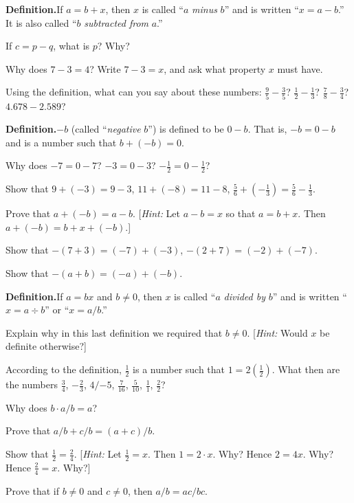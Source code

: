 \documentclass[11pt]{book}
\theoremstyle{bkplain}
\theoremstyle{XIplainnote}
\theoremstyle{bkplain}
\theoremstyle{bkplain}
\begin{document}
\medskip
\noindent\textbf{Definition.}\quad If $a = b + x$, then $x$ is called ``$a$
\emph{minus} $b$'' and is written ``$x = a - b$.'' It is also called ``$b$
\emph{subtracted from} $a$.''

\begin{exlist}
\item If $c = p - q$, what is $p$? Why?
\item Why does $7 - 3 = 4$? Write $7 - 3 = x$, and ask what property $x$ must
      have.
\item Using the definition, what can you say about these numbers:
      $\frac{9}{5} - \frac{3}{5}$? $\frac{1}{2} - \frac{1}{3}$?
      $\frac{7}{8} - \frac{3}{4}$? $4.678 - 2.589$?
\end{exlist}

\medskip
\noindent\textbf{Definition.}\quad $-b$ (called ``\emph{negative} $b$'') is
defined to be $0 - b$. That is, $-b = 0 - b$ and is a number such that
$b + (-b) = 0$.

\begin{exlist}[start=4]
\item Why does $-7 = 0 - 7$? $-3 = 0 - 3$?
      $-\frac{1}{2} = 0 - \frac{1}{2}$?
\item Show that $9 + (-3) = 9 - 3$, $11 + (-8) = 11 - 8$,
      $\frac{5}{6} + (-\frac{1}{3}) = \frac{5}{6} - \frac{1}{3}$.
\item[\stex 6.] Prove that $a + (-b) = a - b$. [\emph{Hint:} Let $a - b = x$ so
      that $a = b + x$. Then $a + (-b) = b + x + (-b)$.]
\item[7.] Show that $-(7 + 3) = (-7) + (-3)$, $-(2 + 7) = (-2) + (-7)$.
\item[8.] Show that $-(a + b) = (-a) + (-b)$.
\end{exlist}

\medskip
\noindent\textbf{Definition.}\quad If $a = bx$ and $b \neq 0$, then $x$ is called
``$a$ \emph{divided by} $b$'' and is written ``$x = a \div b$'' or
``$x = a/b$.''

\begin{exlist}[start=9]
\item Explain why in this last definition we required that $b \neq 0$.
      [\emph{Hint:} Would $x$ be definite otherwise?]
\item According to the definition, $\frac{1}{2}$ is a number such that
      $1 = 2(\frac{1}{2})$. What then are the numbers $\frac{3}{4}$,
      $-\frac{2}{3}$, $4/{-5}$, $\frac{7}{16}$, $\frac{5}{10}$, $\frac{1}{1}$,
      $\frac{2}{2}$?
\item Why does $b \cdot a/b = a$?
\item Prove that $a/b + c/b = (a + c)/b$.
\item Show that $\frac{1}{2} = \frac{2}{4}$. [\emph{Hint:} Let
      $\frac{1}{2} = x$. Then $1 = 2 \cdot x$. Why? Hence $2 = 4x$. Why? Hence
      $\frac{2}{4} = x$. Why?]
\item Prove that if $b \neq 0$ and $c \neq 0$, then $a/b = ac/bc$.
\end{exlist}
\clearpage
\setcounter{theorem}{0}\setcounter{definition}{0}\setcounter{construction}{0}\setcounter{exgroup}{0}\setcounter{footnote}{0}
\setcounter{chapter}{4}
\end{document}
